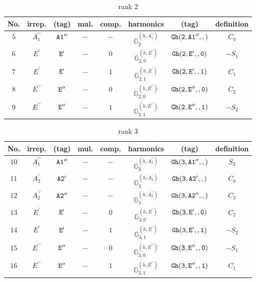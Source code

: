 \documentclass[fleqn,8pt]{jsarticle}
\begin{document}
\begin{table}[ht!]
\begin{center}
\caption{rank 2}
\renewcommand{\arraystretch}{1.3}
\begin{tabular}{cccccccc} \hline \hline
No. & irrep. & (tag) & mul. & comp. & harmonics & (tag) & definition \\ \hline
$ 5 $ & $ A_{1}^{\prime\prime} $ & $ {\tt A1''} $ & $ - $ & $ - $ & $ \mathbb{G}_{2}^{(h,A_{1}^{\prime\prime})} $ & $ {\tt Gh(2,A1'',,)} $ & $ C_{0} $ \\
$ 6 $ & $ E^{\prime} $ & $ {\tt E'} $ & $ - $ & $ 0 $ & $ \mathbb{G}_{2,0}^{(h,E^{\prime})} $ & $ {\tt Gh(2,E',,0)} $ & $ - S_{1} $ \\
$ 7 $ & $ E^{\prime} $ & $ {\tt E'} $ & $ - $ & $ 1 $ & $ \mathbb{G}_{2,1}^{(h,E^{\prime})} $ & $ {\tt Gh(2,E',,1)} $ & $ C_{1} $ \\
$ 8 $ & $ E^{\prime\prime} $ & $ {\tt E''} $ & $ - $ & $ 0 $ & $ \mathbb{G}_{2,0}^{(h,E^{\prime\prime})} $ & $ {\tt Gh(2,E'',,0)} $ & $ C_{2} $ \\
$ 9 $ & $ E^{\prime\prime} $ & $ {\tt E''} $ & $ - $ & $ 1 $ & $ \mathbb{G}_{2,1}^{(h,E^{\prime\prime})} $ & $ {\tt Gh(2,E'',,1)} $ & $ - S_{2} $ \\
 \hline \hline
\end{tabular}
\end{center}
\end{table}
\begin{table}[ht!]
\begin{center}
\caption{rank 3}
\renewcommand{\arraystretch}{1.3}
\begin{tabular}{cccccccc} \hline \hline
No. & irrep. & (tag) & mul. & comp. & harmonics & (tag) & definition \\ \hline
$ 10 $ & $ A_{1}^{\prime\prime} $ & $ {\tt A1''} $ & $ - $ & $ - $ & $ \mathbb{G}_{3}^{(h,A_{1}^{\prime\prime})} $ & $ {\tt Gh(3,A1'',,)} $ & $ S_{3} $ \\
$ 11 $ & $ A_{2}^{\prime} $ & $ {\tt A2'} $ & $ - $ & $ - $ & $ \mathbb{G}_{3}^{(h,A_{2}^{\prime})} $ & $ {\tt Gh(3,A2',,)} $ & $ C_{0} $ \\
$ 12 $ & $ A_{2}^{\prime\prime} $ & $ {\tt A2''} $ & $ - $ & $ - $ & $ \mathbb{G}_{3}^{(h,A_{2}^{\prime\prime})} $ & $ {\tt Gh(3,A2'',,)} $ & $ C_{3} $ \\
$ 13 $ & $ E^{\prime} $ & $ {\tt E'} $ & $ - $ & $ 0 $ & $ \mathbb{G}_{3,0}^{(h,E^{\prime})} $ & $ {\tt Gh(3,E',,0)} $ & $ C_{2} $ \\
$ 14 $ & $ E^{\prime} $ & $ {\tt E'} $ & $ - $ & $ 1 $ & $ \mathbb{G}_{3,1}^{(h,E^{\prime})} $ & $ {\tt Gh(3,E',,1)} $ & $ - S_{2} $ \\
$ 15 $ & $ E^{\prime\prime} $ & $ {\tt E''} $ & $ - $ & $ 0 $ & $ \mathbb{G}_{3,0}^{(h,E^{\prime\prime})} $ & $ {\tt Gh(3,E'',,0)} $ & $ - S_{1} $ \\
$ 16 $ & $ E^{\prime\prime} $ & $ {\tt E''} $ & $ - $ & $ 1 $ & $ \mathbb{G}_{3,1}^{(h,E^{\prime\prime})} $ & $ {\tt Gh(3,E'',,1)} $ & $ C_{1} $ \\
 \hline \hline
\end{tabular}
\end{center}
\end{table}
\end{document}
